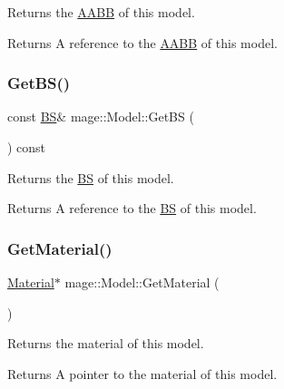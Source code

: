 Returns the \hyperlink{structmage_1_1_a_a_b_b}{A\+A\+BB} of this model.

\begin{DoxyReturn}{Returns}
A reference to the \hyperlink{structmage_1_1_a_a_b_b}{A\+A\+BB} of this model. 
\end{DoxyReturn}
\hypertarget{classmage_1_1_model_a7d99f18fd9cd6902795f77995b87bea2}{}\label{classmage_1_1_model_a7d99f18fd9cd6902795f77995b87bea2} 
\subsubsection{\texorpdfstring{Get\+B\+S()}{GetBS()}}
{\footnotesize\ttfamily const \hyperlink{structmage_1_1_b_s}{BS}\& mage\+::\+Model\+::\+Get\+BS (\begin{DoxyParamCaption}{ }\end{DoxyParamCaption}) const\hspace{0.3cm}{\ttfamily [noexcept]}}

Returns the \hyperlink{structmage_1_1_b_s}{BS} of this model.

\begin{DoxyReturn}{Returns}
A reference to the \hyperlink{structmage_1_1_b_s}{BS} of this model. 
\end{DoxyReturn}
\hypertarget{classmage_1_1_model_a46728db5ca9052c62e9403ec7d6a6c21}{}\label{classmage_1_1_model_a46728db5ca9052c62e9403ec7d6a6c21} 
\subsubsection{\texorpdfstring{Get\+Material()}{GetMaterial()}\hspace{0.1cm}{\footnotesize\ttfamily [1/2]}}
{\footnotesize\ttfamily \hyperlink{classmage_1_1_material}{Material}$\ast$ mage\+::\+Model\+::\+Get\+Material (\begin{DoxyParamCaption}{ }\end{DoxyParamCaption})\hspace{0.3cm}{\ttfamily [noexcept]}}

Returns the material of this model.

\begin{DoxyReturn}{Returns}
A pointer to the material of this model. 
\end{DoxyReturn}
\hypertarget{classmage_1_1_model_a10a9de6608365356b5b6ad2669ab39f8}{}\label{classmage_1_1_model_a10a9de6608365356b5b6ad2669ab39f8} 
